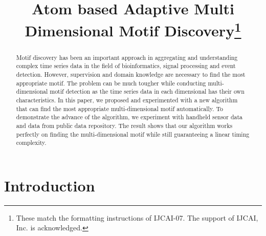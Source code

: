 \documentclass{article}
\begin{document}
\title{Atom based Adaptive Multi Dimensional Motif Discovery\thanks{These match the formatting instructions of IJCAI-07. The support of IJCAI, Inc. is acknowledged.}}
\maketitle

\begin{abstract}
  {    Motif discovery has been an important approach in aggregating and understanding complex 
	time series data in the field of bioinformatics, signal processing and event detection. However, 
	supervision and domain knowledge are necessary to find the most appropriate motif. The problem 
	can be much tougher while conducting multi-dimensional motif detection as the time series data 
	in each dimensional has their own characteristics. In this paper, we proposed and experimented with 
	a new algorithm that can find the most appropriate multi-dimensional motif automatically. To demonstrate the advance of the algorithm, 
	we experiment with handheld sensor data and data from public data repository. The result shows that 
	our algorithm works perfectly on finding the multi-dimensional motif while still guaranteeing a linear 
	timing complexity. 
	}
\end{abstract}

\section{Introduction}
\end{document}
